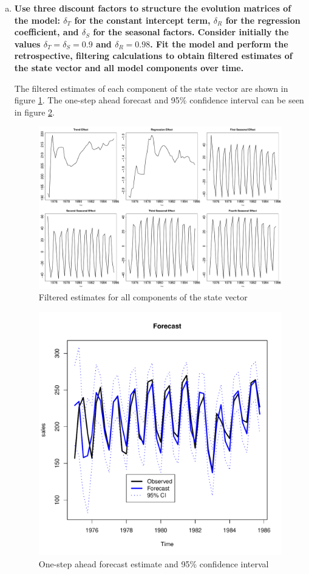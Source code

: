 \documentclass{article}
\begin{document}
\begin{enumerate}[(a)]
		\item \textbf{Use three discount factors to structure the evolution matrices of the model: $\delta_T$ for the constant intercept term, $\delta_R$ for the regression coefficient, and $\delta_S$ for the seasonal factors. Consider initially the values $\delta_T = \delta_S = 0.9$ and $\delta_R = 0.98$. Fit the model and perform the retrospective, filtering calculations to obtain filtered estimates of the state vector and all model components over time.}
		
		The filtered estimates of each component of the state vector are shown in figure \ref{fig:filteredestimates}. The one-step ahead forecast and 95\% confidence interval can be seen in figure \ref{fig:forecastdist}.
		
		\begin{figure}
			\centering
			\includegraphics[width=\linewidth]{Filteredestimates}
			\caption{Filtered estimates for all components of the state vector}
			\label{fig:filteredestimates}
		\end{figure}
		
		\begin{figure}
			\centering
			\includegraphics[width=0.7\linewidth]{ForecastDist}
			\caption{One-step ahead forecast estimate and 95\% confidence interval}
			\label{fig:forecastdist}
		\end{figure}
		

\end{enumerate}
\end{document}
